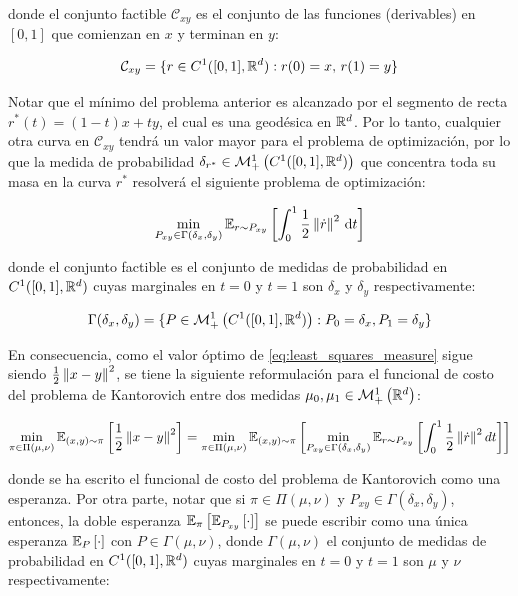 donde el conjunto factible $\mathcal{C}_{xy}$ es el conjunto de las funciones (derivables) en $[0,1]$ que comienzan en $x$ y terminan en $y$:

\begin{equation*}
	\mathcal{C}_{xy} = \{r\in C^1([0,1],\mathbb{R}^d): r(0)=x,\,r(1)=y\}
\end{equation*}

Notar que el mínimo del problema anterior es alcanzado por el segmento de recta $r^*(t)=(1-t)x+ty$, el cual es una geodésica en $\mathbb{R}^d$. Por lo tanto, cualquier otra curva en $\mathcal{C}_{xy}$ tendrá un valor mayor para el problema de optimización, por lo que la medida de probabilidad $\delta_{r^*}\in\mathcal{M}_+^1\left(C^1([0,1],\mathbb{R}^d)\right)$ que concentra toda su masa en la curva $r^*$ resolverá el siguiente problema de optimización:

\begin{equation}
	\label{eq:least_squares_measure}
	\min_{P_{xy}\in \Gamma(\delta_x,\delta_y)} \mathbb{E}_{r\sim P_{xy}}\left[\int_0^1 \frac{1}{2} \left\lVert \dot{r} \right\rVert^2 \,\operatorname{d}\! t\right]
\end{equation}

donde el conjunto factible es el conjunto de medidas de probabilidad en $C^1([0,1],\mathbb{R}^d)$ cuyas marginales en $t=0$ y $t=1$ son $\delta_x$ y $\delta_y$ respectivamente:

\begin{equation*}
	\Gamma(\delta_x,\delta_y) = \{P\in \mathcal{M}_+^1\left(C^1([0,1],\mathbb{R}^d)\right): P_0=\delta_x, P_1 = \delta_y\}
\end{equation*}

En consecuencia, como el valor óptimo de \eqref{eq:least_squares_measure} sigue siendo $\frac{1}{2} \left\lVert x-y \right\rVert^2$, se tiene la siguiente reformulación para el funcional de costo del problema de Kantorovich entre dos medidas $\mu_0,\mu_1\in\mathcal{M}_+^1\left(\mathbb{R}^d\right)$:

\begin{equation}
	\label{eq:dynamic_kantorovich_1}
	\min_{\pi\in\Pi(\mu,\nu)} \mathbb{E}_{(x,y)\sim\pi}\left[\frac{1}{2} \left\lVert x-y \right\rVert^2\right]
	= \min_{\pi\in\Pi(\mu,\nu)} \mathbb{E}_{(x,y)\sim\pi}\left[
		\min_{P_{xy}\in \Gamma(\delta_x,\delta_y)} \mathbb{E}_{r\sim P_{xy}}\left[\int_0^1 \frac{1}{2} \left\lVert \dot{r} \right\rVert^2 dt\right]\right]
\end{equation}

donde se ha escrito el funcional de costo del problema de Kantorovich como una esperanza. Por otra parte, notar que si $\pi\in\Pi(\mu,\nu)$ y $P_{xy}\in \Gamma(\delta_x,\delta_y)$, entonces, la doble esperanza $\mathbb{E}_{\pi}\left[\mathbb{E}_{P_{xy}}\left[\cdot\right]\right]$ se puede escribir como una única esperanza $\mathbb{E}_{P}\left[\cdot\right]$ con $P\in\Gamma(\mu,\nu)$, donde $\Gamma(\mu,\nu)$ el conjunto de medidas de probabilidad en $C^1([0,1],\mathbb{R}^d)$ cuyas marginales en $t=0$ y $t=1$ son $\mu$ y $\nu$ respectivamente:

